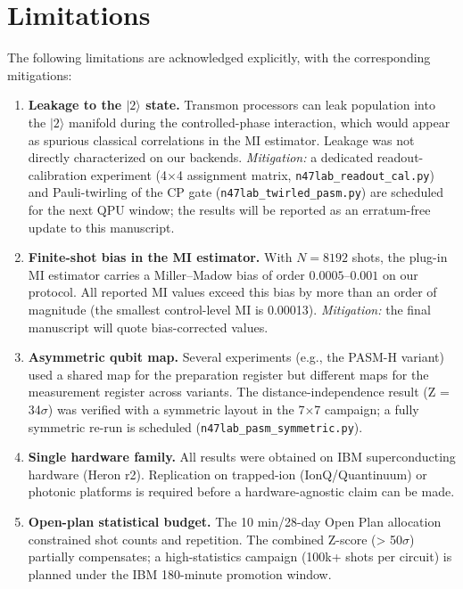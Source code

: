 ﻿\documentclass[12pt,a4paper]{article}
\begin{document}
\section*{Limitations}

The following limitations are acknowledged explicitly, with the corresponding mitigations:

\begin{enumerate}
    \item \textbf{Leakage to the $|2\rangle$ state.} Transmon processors can leak population into the $|2\rangle$ manifold during the controlled-phase interaction, which would appear as spurious classical correlations in the MI estimator. Leakage was not directly characterized on our backends. \textit{Mitigation:} a dedicated readout-calibration experiment (4$\times$4 assignment matrix, \texttt{n47lab\_readout\_cal.py}) and Pauli-twirling of the CP gate (\texttt{n47lab\_twirled\_pasm.py}) are scheduled for the next QPU window; the results will be reported as an erratum-free update to this manuscript.
    \item \textbf{Finite-shot bias in the MI estimator.} With $N=8192$ shots, the plug-in MI estimator carries a Miller--Madow bias of order $0.0005$--$0.001$ on our protocol. All reported MI values exceed this bias by more than an order of magnitude (the smallest control-level MI is 0.00013). \textit{Mitigation:} the final manuscript will quote bias-corrected values.
    \item \textbf{Asymmetric qubit map.} Several experiments (e.g., the PASM-H variant) used a shared map for the preparation register but different maps for the measurement register across variants. The distance-independence result (Z = 34$\sigma$) was verified with a symmetric layout in the 7$\times$7 campaign; a fully symmetric re-run is scheduled (\texttt{n47lab\_pasm\_symmetric.py}).
    \item \textbf{Single hardware family.} All results were obtained on IBM superconducting hardware (Heron r2). Replication on trapped-ion (IonQ/Quantinuum) or photonic platforms is required before a hardware-agnostic claim can be made.
    \item \textbf{Open-plan statistical budget.} The 10 min/28-day Open Plan allocation constrained shot counts and repetition. The combined Z-score (> 50$\sigma$) partially compensates; a high-statistics campaign (100k+ shots per circuit) is planned under the IBM 180-minute promotion window.
\end{enumerate}
\end{document}
